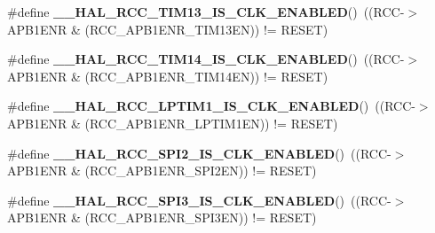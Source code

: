 \begin{DoxyCompactItemize}
\item 
\mbox{\label{group___r_c_c_ex___peripheral___clock___enable___disable___status_gaeb7cf0d708375a807c690fbb070298dd}} 
\#define {\bfseries \+\_\+\+\_\+\+H\+A\+L\+\_\+\+R\+C\+C\+\_\+\+T\+I\+M13\+\_\+\+I\+S\+\_\+\+C\+L\+K\+\_\+\+E\+N\+A\+B\+L\+ED}()~((R\+CC-\/$>$A\+P\+B1\+E\+NR \& (R\+C\+C\+\_\+\+A\+P\+B1\+E\+N\+R\+\_\+\+T\+I\+M13\+EN)) != R\+E\+S\+ET)
\item 
\mbox{\label{group___r_c_c_ex___peripheral___clock___enable___disable___status_gaf40a1f6a134b09aaa211ad159e613d1a}} 
\#define {\bfseries \+\_\+\+\_\+\+H\+A\+L\+\_\+\+R\+C\+C\+\_\+\+T\+I\+M14\+\_\+\+I\+S\+\_\+\+C\+L\+K\+\_\+\+E\+N\+A\+B\+L\+ED}()~((R\+CC-\/$>$A\+P\+B1\+E\+NR \& (R\+C\+C\+\_\+\+A\+P\+B1\+E\+N\+R\+\_\+\+T\+I\+M14\+EN)) != R\+E\+S\+ET)
\item 
\mbox{\label{group___r_c_c_ex___peripheral___clock___enable___disable___status_ga9c3c0f83528521d1122fe9436271ec70}} 
\#define {\bfseries \+\_\+\+\_\+\+H\+A\+L\+\_\+\+R\+C\+C\+\_\+\+L\+P\+T\+I\+M1\+\_\+\+I\+S\+\_\+\+C\+L\+K\+\_\+\+E\+N\+A\+B\+L\+ED}()~((R\+CC-\/$>$A\+P\+B1\+E\+NR \& (R\+C\+C\+\_\+\+A\+P\+B1\+E\+N\+R\+\_\+\+L\+P\+T\+I\+M1\+EN)) != R\+E\+S\+ET)
\item 
\mbox{\label{group___r_c_c_ex___peripheral___clock___enable___disable___status_ga282522dda9557cf715be3ee13c031a5b}} 
\#define {\bfseries \+\_\+\+\_\+\+H\+A\+L\+\_\+\+R\+C\+C\+\_\+\+S\+P\+I2\+\_\+\+I\+S\+\_\+\+C\+L\+K\+\_\+\+E\+N\+A\+B\+L\+ED}()~((R\+CC-\/$>$A\+P\+B1\+E\+NR \& (R\+C\+C\+\_\+\+A\+P\+B1\+E\+N\+R\+\_\+\+S\+P\+I2\+EN)) != R\+E\+S\+ET)
\item 
\mbox{\label{group___r_c_c_ex___peripheral___clock___enable___disable___status_ga3de049f8b2ad6c2d4561863021f9e2f9}} 
\#define {\bfseries \+\_\+\+\_\+\+H\+A\+L\+\_\+\+R\+C\+C\+\_\+\+S\+P\+I3\+\_\+\+I\+S\+\_\+\+C\+L\+K\+\_\+\+E\+N\+A\+B\+L\+ED}()~((R\+CC-\/$>$A\+P\+B1\+E\+NR \& (R\+C\+C\+\_\+\+A\+P\+B1\+E\+N\+R\+\_\+\+S\+P\+I3\+EN)) != R\+E\+S\+ET)
\item 

\end{DoxyCompactItemize}
